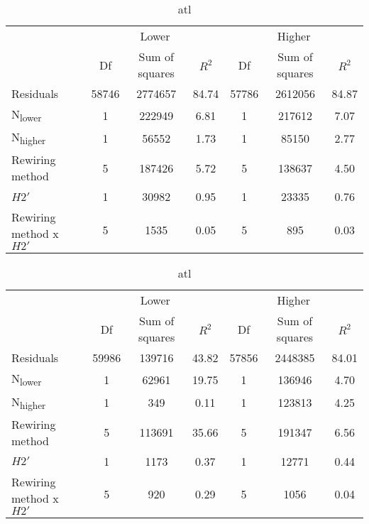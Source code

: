 \documentclass[12pt,a4paper]{article}
\begin{document}
\begin{table}
\ContinuedFloat
\caption{continued}
    \begin{subtable}{\linewidth}
    \caption{atL}
    \centering
\begin{tabularx}{\linewidth}{@{} X *6{c} @{}}
\toprule
  & \multicolumn{3}{c}{Lower} & \multicolumn{3}{c}{Higher} \\ \cmidrule(l){2-4} \cmidrule(l){5-7}
  						& Df		& Sum of squares	& $R^2$	& Df 	& Sum of squares	& $R^2$ \\ \midrule
Residuals 				& 58746 & 2774657			& 84.74	& 57786 & 2612056 		& 84.87   \\
N\textsubscript{lower} 	& 1 		& 222949 		& 6.81 	& 1		& 217612 			& 7.07  \\
N\textsubscript{higher} 	& 1 		& 56552 			& 1.73	& 1 		& 85150			& 2.77  \\
Rewiring method 			& 5 		& 187426			& 5.72 	& 5 		& 138637			& 4.50  \\
$H2'$ 					& 1 		& 30982 			& 0.95 	& 1 		& 23335			& 0.76 \\
Rewiring method x $H2'$ 	& 5 		& 1535 			& 0.05 	& 5 		& 895			& 0.03  \\ \bottomrule
\end{tabularx}
\end{subtable}

\medskip
    \begin{subtable}{\linewidth}
    \caption{atl}
    \centering
\begin{tabularx}{\linewidth}{@{} X *6{c} @{}}
\toprule
  & \multicolumn{3}{c}{Lower} & \multicolumn{3}{c}{Higher} \\ \cmidrule(l){2-4} \cmidrule(l){5-7}
  						& Df		& Sum of squares	& $R^2$	& Df 	& Sum of squares	& $R^2$ \\ \midrule
Residuals 				& 59986 & 139716			& 43.82	& 57856 & 2448385		& 84.01   \\
N\textsubscript{lower} 	& 1 		& 62961 			& 19.75 	& 1		& 136946			& 4.70  \\
N\textsubscript{higher} 	& 1 		& 349 			& 0.11	& 1 		& 123813 			& 4.25  \\
Rewiring method 			& 5 		& 113691 			& 35.66 	& 5 		& 191347			& 6.56  \\
$H2'$ 					& 1 		& 1173 			& 0.37 	& 1 		& 12771			& 0.44 \\
Rewiring method x $H2'$ 	& 5 		& 920 			& 0.29 	& 5 		& 1056			&  0.04  \\ \bottomrule
\end{tabularx}
\end{subtable}


\end{table}
\end{document}
